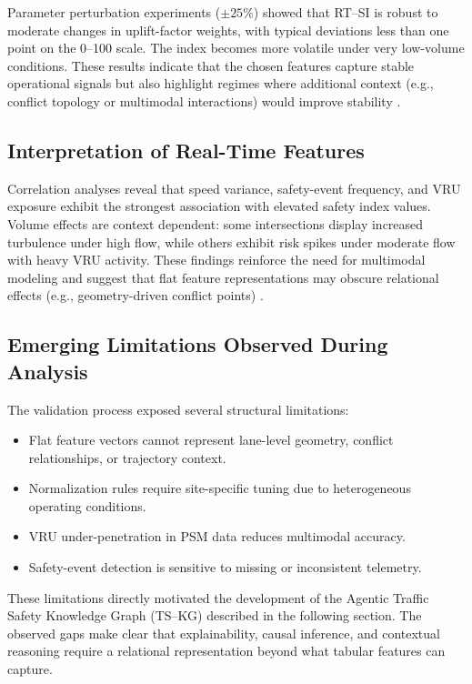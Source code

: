 \documentclass[conference]{IEEEtran}
\begin{document}
Parameter perturbation experiments (\(\pm 25\%\)) showed that RT--SI is
robust to moderate changes in uplift-factor weights, with typical deviations less than one
point on the 0--100 scale. The index becomes more volatile under very low-volume
conditions. These results indicate that the chosen
features capture stable operational signals but also highlight regimes where additional
context (e.g., conflict topology or multimodal interactions) would improve stability
\cite{gettman2003ssam, wang2021highres}.

\subsection{Interpretation of Real-Time Features}

Correlation analyses reveal that speed variance, safety-event frequency, and VRU
exposure exhibit the strongest association with elevated safety index values. Volume
effects are context dependent: some intersections display increased turbulence under high
flow, while others exhibit risk spikes under moderate flow with heavy VRU activity.
These findings reinforce the need for multimodal modeling and suggest that flat feature
representations may obscure relational effects (e.g., geometry-driven conflict points)
\cite{wang2021highres, schultz2025_surrogate, gettman2003ssam}.

\subsection{Emerging Limitations Observed During Analysis}

The validation process exposed several structural limitations:

\begin{itemize}
    \item Flat feature vectors cannot represent lane-level geometry, conflict relationships,
          or trajectory context.
    \item Normalization rules require site-specific tuning due to heterogeneous operating
          conditions.
    \item VRU under-penetration in PSM data reduces multimodal accuracy.
    \item Safety-event detection is sensitive to missing or inconsistent telemetry.
\end{itemize}

These limitations directly motivated the development of the Agentic Traffic Safety
Knowledge Graph (TS--KG) described in the following section. The observed gaps
make clear that explainability, causal inference, and contextual reasoning require a 
relational representation beyond what tabular features can capture.
\end{document}
